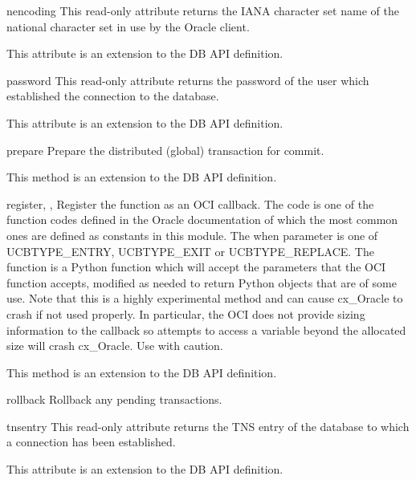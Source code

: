 \documentclass{manual}
\begin{document}
\begin{datadesc}{nencoding}
  This read-only attribute returns the IANA character set name of the national
  character set in use by the Oracle client.

   This attribute is an extension to the DB API definition.
\end{datadesc}

\begin{datadesc}{password}
  This read-only attribute returns the password of the user which established
  the connection to the database.

   This attribute is an extension to the DB API definition.
\end{datadesc}

\begin{funcdesc}{prepare}{}
  Prepare the distributed (global) transaction for commit.

   This method is an extension to the DB API definition.
\end{funcdesc}

\begin{funcdesc}{register}{, , }
  Register the function as an OCI callback. The code is one of the function
  codes defined in the Oracle documentation of which the most common ones are
  defined as constants in this module. The when parameter is one of
  UCBTYPE_ENTRY, UCBTYPE_EXIT or UCBTYPE_REPLACE. The function is a Python
  function which will accept the parameters that the OCI function accepts,
  modified as needed to return Python objects that are of some use. Note that
  this is a highly experimental method and can cause cx_Oracle to crash if not
  used properly. In particular, the OCI does not provide sizing information to
  the callback so attempts to access a variable beyond the allocated size will
  crash cx_Oracle. Use with caution.

   This method is an extension to the DB API definition.
\end{funcdesc}

\begin{funcdesc}{rollback}{}
  Rollback any pending transactions.
\end{funcdesc}

\begin{datadesc}{tnsentry}
  This read-only attribute returns the TNS entry of the database to which a
  connection has been established.

   This attribute is an extension to the DB API definition.
\end{datadesc}
\end{document}
